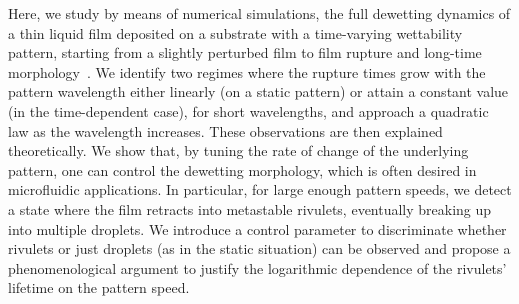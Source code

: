 Here, we study by means of numerical simulations, the full dewetting dynamics of a thin liquid film deposited on a substrate with a time-varying wettability pattern, starting from a slightly perturbed film to film rupture and long-time morphology~\cite{konnurInstabilityMorphologyThin2000}. 
We identify two regimes where the rupture times grow with the pattern wavelength either linearly (on a static pattern) or attain a constant value (in the time-dependent case), for short wavelengths, and approach a quadratic law as the wavelength increases. 
These observations are then explained theoretically. 
We show that, by tuning the rate of change of the underlying pattern, one can control the dewetting morphology, which is often desired in microfluidic applications.
In particular, for large enough pattern speeds, we detect a state where the film retracts into metastable rivulets, eventually breaking up into multiple droplets.
We introduce a control parameter to discriminate whether rivulets or just droplets (as in the static situation) can be observed and propose a phenomenological argument to justify the logarithmic dependence of the rivulets' lifetime on the pattern speed.

